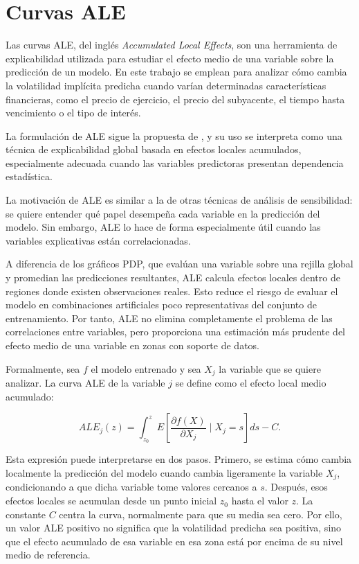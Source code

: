 \chapter{Curvas ALE}
\label{app:ale}

Las curvas ALE, del inglés \emph{Accumulated Local Effects}, son una herramienta de explicabilidad utilizada para estudiar el efecto medio de una variable sobre la predicción de un modelo. En este trabajo se emplean para analizar cómo cambia la volatilidad implícita predicha cuando varían determinadas características financieras, como el precio de ejercicio, el precio del subyacente, el tiempo hasta vencimiento o el tipo de interés.

La formulación de ALE sigue la propuesta de \citet{apley2020visualizing}, y su uso se interpreta como una técnica de explicabilidad global basada en efectos locales acumulados, especialmente adecuada cuando las variables predictoras presentan dependencia estadística.

La motivación de ALE es similar a la de otras técnicas de análisis de sensibilidad: se quiere entender qué papel desempeña cada variable en la predicción del modelo. Sin embargo, ALE lo hace de forma especialmente útil cuando las variables explicativas están correlacionadas.

A diferencia de los gráficos PDP, que evalúan una variable sobre una rejilla global y promedian las predicciones resultantes, ALE calcula efectos locales dentro de regiones donde existen observaciones reales. Esto reduce el riesgo de evaluar el modelo en combinaciones artificiales poco representativas del conjunto de entrenamiento. Por tanto, ALE no elimina completamente el problema de las correlaciones entre variables, pero proporciona una estimación más prudente del efecto medio de una variable en zonas con soporte de datos.

Formalmente, sea \(f\) el modelo entrenado y sea \(X_j\) la variable que se quiere analizar. La curva ALE de la variable \(j\) se define como el efecto local medio acumulado:

\begin{equation}
ALE_j(z)=
\int_{z_0}^{z}
E\left[
\frac{\partial f(X)}{\partial X_j}
\mid X_j=s
\right]ds
-C.
\label{eq:ale}
\end{equation}

Esta expresión puede interpretarse en dos pasos. Primero, se estima cómo cambia localmente la predicción del modelo cuando cambia ligeramente la variable \(X_j\), condicionando a que dicha variable tome valores cercanos a \(s\). Después, esos efectos locales se acumulan desde un punto inicial \(z_0\) hasta el valor \(z\). La constante \(C\) centra la curva, normalmente para que su media sea cero. Por ello, un valor ALE positivo no significa que la volatilidad predicha sea positiva, sino que el efecto acumulado de esa variable en esa zona está por encima de su nivel medio de referencia.

